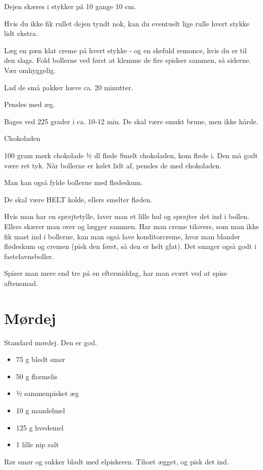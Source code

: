 \documentclass[
  letterpaper,
  DIV=11,
  numbers=noendperiod]{scrreprt}
\providecommand{\tightlist}{%
  \setlength{\itemsep}{0pt}\setlength{\parskip}{0pt}}\usepackage{longtable,booktabs,array}
\begin{document}
Dejen skæres i stykker på 10 gange 10 cm.

Hvis du ikke fik rullet dejen tyndt nok, kan du eventuelt lige rulle
hvert stykke lidt ekstra.

Læg en pæn klat creme på hvert stykke - og en skefuld remonce, hvis du
er til den slags. Fold bollerne ved først at klemme de fire spidser
sammen, så siderne. Vær omhyggelig.

Lad de små pakker hæve ca. 20 minutter.

Pensles med æg.

Bages ved 225 grader i ca. 10-12 min. De skal være smukt brune, men ikke
hårde.

Chokoladen

100 gram mørk chokolade ½ dl fløde Smelt chokoladen, kom fløde i. Den må
godt være ret tyk. Når bollerne er kølet lidt af, pensles de med
chokoladen.

Man kan også fylde bollerne med flødeskum.

De skal være HELT kolde, ellers smelter fløden.

Hvis man har en sprøjtetylle, laver man et lille hul og sprøjter det ind
i bollen. Ellers skærer man over og lægger sammen. Har man creme
tilovers, som man ikke fik mast ind i bollerne, kan man også lave
konditorcreme, hvor man blander flødeskum og cremen (pisk den først, så
den er helt glat). Det smager også godt i fastelavnsboller.

Spiser man mere end tre på en eftermiddag, har man svært ved at spise
aftensmad.

\hypertarget{muxf8rdej}{%
\section{Mørdej}\label{muxf8rdej}}

Standard mørdej. Den er god.

\begin{itemize}
\tightlist
\item
  75 g blødt smør
\item
  50 g flormelis
\item
  1⁄2 sammenpisket æg
\item
  10 g mandelmel
\item
  125 g hvedemel
\item
  1 lille nip salt
\end{itemize}

Rør smør og sukker blødt med elpiskeren. Tilsæt ægget, og pisk det ind.
\end{document}
